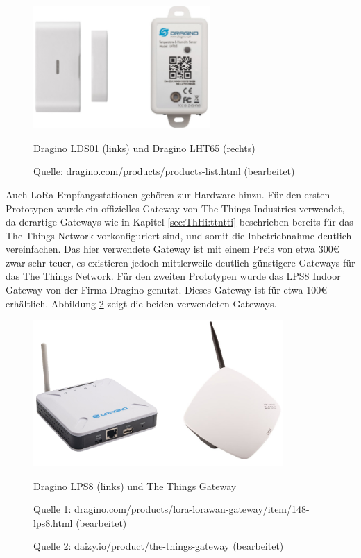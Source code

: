 \begin{figure}[H]
  \vspace{10pt}
  \begin{center}
    \includegraphics[width=0.6\textwidth]{./images/sensoren.jpg}
  \end{center}
  \vspace{-5pt}
  \caption[Dragino LDS01 und Dragino LHT65 Sensoren]{Dragino LDS01 (links) und Dragino LHT65 (rechts)}
  \caption*{Quelle: {dragino.com/products/products-list.html (bearbeitet)}}
  \label{fig:sensors}
\end{figure}

Auch LoRa-Empfangsstationen gehören zur Hardware hinzu. Für den ersten Prototypen wurde ein offizielles Gateway von The Things Industries verwendet, da derartige Gateways wie in Kapitel \ref{sec:ThHi:ttntti}  beschrieben bereits für das The Things Network vorkonfiguriert sind, und somit die Inbetriebnahme deutlich vereinfachen. Das hier verwendete Gateway ist mit einem Preis von etwa 300€ zwar sehr teuer, es existieren jedoch mittlerweile deutlich günstigere Gateways für das The Things Network. Für den zweiten Prototypen wurde das LPS8 Indoor Gateway von der Firma Dragino genutzt. Dieses Gateway ist für etwa 100€ erhältlich. Abbildung \ref{fig:gateways} zeigt die beiden verwendeten Gateways.

\begin{figure}[H]
  \vspace{10pt}
  \begin{center}
    \includegraphics[width=0.85\textwidth]{./images/gateways.jpg}
  \end{center}
  \vspace{-5pt}
  \caption[Dragino LPS8 Gateway und The Things Gateway]{Dragino LPS8 (links) und The Things Gateway}
  \caption*{Quelle 1: {dragino.com/products/lora-lorawan-gateway/item/148-lps8.html (bearbeitet)}}
  \vspace{-10pt}
  \caption*{Quelle 2: {daizy.io/product/the-things-gateway (bearbeitet)}}
  \label{fig:gateways}
\end{figure}

